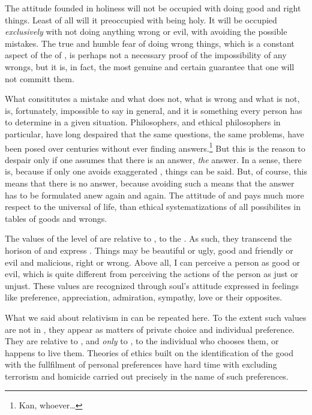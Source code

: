 \pa The attitude founded in holiness will not be occupied with doing
good and right things.  Least of all will it preoccupied with being
holy.  It will be occupied {\em exclusively} with not doing anything
wrong or evil, with avoiding the possible mistakes.  The true and
humble fear of doing wrong things, which is a constant aspect of the
 of , is perhaps not a necessary proof
of the impossibility of any wrongs, but it is, in fact, the most
genuine and certain guarantee that one will not committ them.

\pa What  consititutes a mistake and what does not, what
 is wrong and what is not, is, fortunately, impossible
to say in general, and it is something every person has to determine
in a given situation.  Philosophers, and ethical philosophers in
particular, have long despaired that the same questions, the same
problems, have been posed over centuries without ever finding
answers.\footnote{
 Kan, whoever\ldots} But this is the reason to despair
only if one assumes that there is an answer, {\em the} answer.  In a
sense, there is, because if only one avoids exaggerated
, things can be said.  But, of course, this means that
there is no answer, because avoiding such a  means that
the answer has to be formulated anew again and again.  The attitude of
 and  pays much more respect to the universal
 of life, than ethical systematizations of
all possibilites in tables of goods and wrongs.

\pa\mine The values of the level of  are relative to
, to the .  As such, they transcend the horison of
 and express .  Things may be
beautiful or ugly, good and friendly or evil and malicious, right or
wrong.  Above all, I can perceive a person as good or evil, which is
quite different from perceiving the actions of the person as just or
unjust.  These values are recognized through soul's attitude expressed
in feelings like preference, appreciation, admiration, sympathy, love
or their opposites.  

\subpa What we said about relativism in  can be
repeated here.  To the extent such values are not  in
, they appear as matters of private choice and individual
preference.  They are relative to , and {\em only} to
, to the individual who chooses them, or happens to live
them. Theories of ethics built on the identification of the good with 
the fullfilment of personal preferences have hard time with excluding 
terrorism and homicide carried out precisely in the name of such 
preferences.

